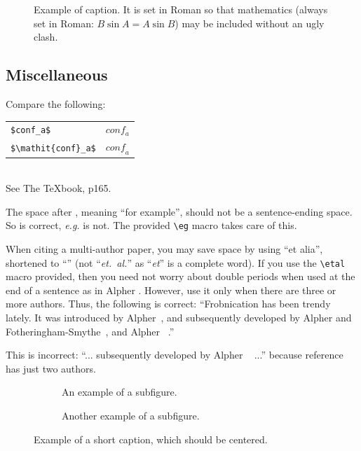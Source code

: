 \begin{figure}[t]
  \centering
  \fbox{\rule{0pt}{2in} \rule{0.9\linewidth}{0pt}}

   \caption{Example of caption.
   It is set in Roman so that mathematics (always set in Roman: $B \sin A = A \sin B$) may be included without an ugly clash.}
   \label{fig:onecol}
\end{figure}

\subsection{Miscellaneous}

\noindent
Compare the following:\\
\begin{tabular}{ll}
 \verb'$conf_a$' &  $conf_a$ \\
 \verb'$\mathit{conf}_a$' & $\mathit{conf}_a$
\end{tabular}\\
See The \TeX book, p165.

The space after \eg, meaning ``for example'', should not be a sentence-ending space.
So \eg is correct, {\em e.g.} is not.
The provided \verb'\eg' macro takes care of this.

When citing a multi-author paper, you may save space by using ``et alia'', shortened to ``\etal'' (not ``{\em et.\ al.}'' as ``{\em et}'' is a complete word).
If you use the \verb'\etal' macro provided, then you need not worry about double periods when used at the end of a sentence as in Alpher \etal.
However, use it only when there are three or more authors.
Thus, the following is correct:
   ``Frobnication has been trendy lately.
   It was introduced by Alpher~\cite{Alpher02}, and subsequently developed by
   Alpher and Fotheringham-Smythe~\cite{Alpher03}, and Alpher \etal~\cite{Alpher04}.''

This is incorrect: ``... subsequently developed by Alpher \etal~\cite{Alpher03} ...'' because reference~\cite{Alpher03} has just two authors.

\begin{figure}
  \centering
  \begin{subfigure}{0.68\linewidth}
    \fbox{\rule{0pt}{2in} \rule{.9\linewidth}{0pt}}
    \caption{An example of a subfigure.}
    \label{fig:short-a}
  \end{subfigure}
  \hfill
  \begin{subfigure}{0.28\linewidth}
    \fbox{\rule{0pt}{2in} \rule{.9\linewidth}{0pt}}
    \caption{Another example of a subfigure.}
    \label{fig:short-b}
  \end{subfigure}
  \caption{Example of a short caption, which should be centered.}
  \label{fig:short}
\end{figure}
